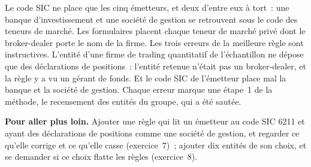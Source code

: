 \begin{omfigure}

\label{fig:in:a-map-of-the-industry:acc}
\end{omfigure}

Le code SIC ne place que les cinq émetteurs, et deux d'entre eux à tort~: une banque d'investissement et une société de gestion se retrouvent
sous le code des teneurs de marché. Les formulaires placent chaque teneur de marché privé dont le broker-dealer porte le nom de la firme. Les trois
erreurs de la meilleure règle sont instructives. L'entité d'une firme de trading quantitatif de l'échantillon ne dépose que des déclarations
de positions~: l'entité retenue n'était pas un broker-dealer, et la règle y a vu un gérant de fonds. Et le code SIC de l'émetteur
place mal la banque et la société de gestion. Chaque erreur marque une étape~1 de la méthode, le recensement des entités du groupe, qui a été
sautée.

\textbf{Pour aller plus loin.} Ajouter une règle qui lit un émetteur au code SIC 6211 et ayant des déclarations de positions comme une société de gestion, et
regarder ce qu'elle corrige et ce qu'elle casse (exercice~7)~; ajouter dix entités de son choix, et se demander si ce choix flatte les règles
(exercice~8).

